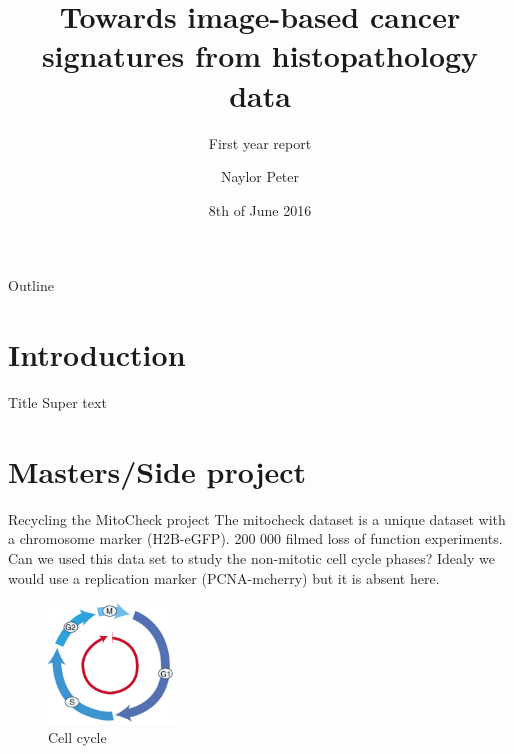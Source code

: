 \documentclass{beamer}
\title{Towards image-based cancer signatures from histopathology data}
\subtitle{First year report}
\author{Naylor Peter}
\date{8th of June 2016}
\begin{document}
\begin{frame}
  \titlepage
\end{frame}

\begin{frame}{Outline}
  \tableofcontents
\end{frame}

\section{Introduction}
\begin{frame}{Title}
Super text
\end{frame}


\section{Masters/Side project}
\begin{frame}{Recycling the MitoCheck project}
The mitocheck dataset is a unique dataset with a chromosome marker (H2B-eGFP). 200 000 filmed loss of function experiments. Can we used this data set to study the non-mitotic cell cycle phases? Idealy we would use a replication marker (PCNA-mcherry) but it is absent here.
\begin{figure}[!ht]
\centering
\includegraphics[width=0.3\textwidth]{Images/somaticcellcycle3.png}
\caption{Cell cycle}
\label{cellcycle}
\end{figure}
\end{frame}
\end{document}
